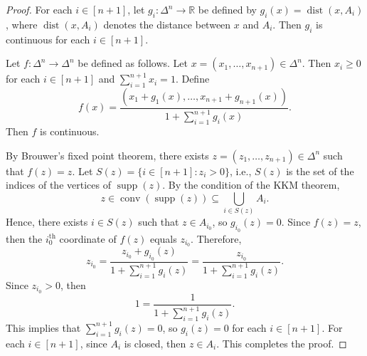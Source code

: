 \documentclass[letterpaper, reqno,12pt]{article}
\newcommand{\RR}{\mathbb{R}}
\DeclareMathOperator{\conv}{conv}
\DeclareMathOperator{\supp}{supp}
\DeclareMathOperator{\dist}{dist}
\begin{document}
\begin{proof}
  For each $i \in [n + 1]$, let $g_i : \Delta^n \to \RR$ be defined by $g_i(x) = \dist(x, A_i)$, where $\dist(x, A_i)$ denotes the distance between $x$ and $A_i$. Then $g_i$ is continuous for each $i \in [n + 1]$.

  Let $f : \Delta^n \to \Delta^n$ be defined as follows. Let $x = (x_1, \ldots, x_{n + 1}) \in \Delta^n$. Then $x_i \geq 0$ for each $i \in [n + 1]$ and $\sum_{i = 1}^{n + 1} x_i = 1$. Define
  $$ f(x) = \frac{\left(x_1 + g_1(x), \ldots, x_{n + 1} + g_{n + 1}(x)\right)}{1 + \sum_{i = 1}^{n + 1} g_i(x)}. $$
  Then $f$ is continuous.

  By Brouwer's fixed point theorem, there exists $z = (z_1, \ldots, z_{n + 1}) \in \Delta^n$ such that $f(z) = z$. Let $S(z) = \{ i \in [n + 1] : z_i > 0 \}$, i.e., $S(z)$ is the set of the indices of the vertices of $\supp(z)$. By the condition of the KKM theorem,
  $$ z \in \conv(\supp(z)) \subseteq \bigcup_{i \in S(z)} A_i. $$
  Hence, there exists $i \in S(z)$ such that $z \in A_{i_0}$, so $g_{i_0}(z) = 0$. Since $f(z) = z$, then the $i_0^\text{th}$ coordinate of $f(z)$ equals $z_{i_0}$. Therefore,
  $$ z_{i_0} = \frac{z_{i_0} + g_{i_0}(z)}{1 + \sum_{i = 1}^{n + 1} g_i(z)} = \frac{z_{i_0}}{1 + \sum_{i = 1}^{n + 1} g_i(z)}. $$
  Since $z_{i_0} > 0$, then
  $$ 1 = \frac{1}{1 + \sum_{i = 1}^{n + 1} g_i(z)}. $$
  This implies that $\sum_{i = 1}^{n + 1} g_i(z) = 0$, so $g_i(z) = 0$ for each $i \in [n + 1]$. For each $i \in [n + 1]$, since $A_i$ is closed, then $z \in A_i$. This completes the proof.
\end{proof}
\end{document}
